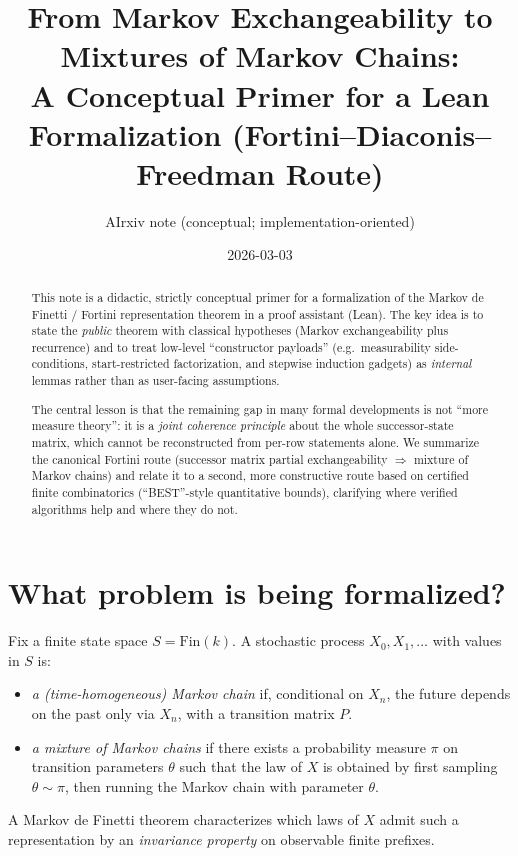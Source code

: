 \documentclass[11pt]{article}
\title{From Markov Exchangeability to Mixtures of Markov Chains:\\
A Conceptual Primer for a Lean Formalization (Fortini--Diaconis--Freedman Route)}
\author{AIrxiv note (conceptual; implementation-oriented)}
\date{2026-03-03}
\newcommand{\Fin}{\mathrm{Fin}}
\begin{document}
\maketitle

\begin{abstract}
This note is a didactic, strictly conceptual primer for a formalization of the Markov de Finetti / Fortini representation theorem in a proof assistant (Lean).
The key idea is to state the \emph{public} theorem with classical hypotheses (Markov exchangeability plus recurrence) and to treat low-level ``constructor payloads''
(e.g.\ measurability side-conditions, start-restricted factorization, and stepwise induction gadgets) as \emph{internal} lemmas rather than as user-facing assumptions.

The central lesson is that the remaining gap in many formal developments is not ``more measure theory'': it is a \emph{joint coherence principle}
about the whole successor-state matrix, which cannot be reconstructed from per-row statements alone.
We summarize the canonical Fortini route (successor matrix partial exchangeability \(\Rightarrow\) mixture of Markov chains) and relate it to a second,
more constructive route based on certified finite combinatorics (``BEST''-style quantitative bounds), clarifying where verified algorithms help and where they do not.
\end{abstract}

\tableofcontents

\section{What problem is being formalized?}

Fix a finite state space \(S = \Fin(k)\). A stochastic process \(X_0,X_1,\dots\) with values in \(S\) is:

\begin{itemize}[leftmargin=2em]
\item \emph{a (time-homogeneous) Markov chain} if, conditional on \(X_n\), the future depends on the past only via \(X_n\), with a transition matrix \(P\).
\item \emph{a mixture of Markov chains} if there exists a probability measure \(\pi\) on transition parameters \(\theta\) such that the law of \(X\) is obtained by first sampling \(\theta \sim \pi\), then running the Markov chain with parameter \(\theta\).
\end{itemize}

A Markov de Finetti theorem characterizes which laws of \(X\) admit such a representation by an \emph{invariance property} on observable finite prefixes.
\end{document}
